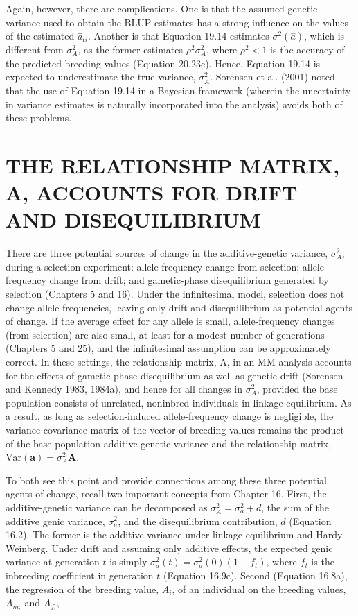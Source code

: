 \documentclass{article}
\begin{document}
Again, however, there are complications. One is that the assumed genetic variance used to obtain the BLUP estimates has a strong influence on the values of the estimated  $ \widehat{a}_{ti} $. Another is that Equation 19.14 estimates  $ \sigma^2(\widehat{a}) $, which is different from  $ \sigma_A^2 $, as the former estimates  $ \rho^2\sigma_A^2 $, where  $ \rho^2 < 1 $ is the accuracy of the predicted breeding values (Equation 20.23c). Hence, Equation 19.14 is expected to underestimate the true variance,  $ \sigma_A^2 $. Sorensen et al. (2001) noted that the use of Equation 19.14 in a Bayesian framework (wherein the uncertainty in variance estimates is naturally incorporated into the analysis) avoids both of these problems.

\section{THE RELATIONSHIP MATRIX, A, ACCOUNTS FOR DRIFT AND DISEQUILIBRIUM}
There are three potential sources of change in the additive-genetic variance,  $ \sigma_A^2 $, during a selection experiment: allele-frequency change from selection; allele-frequency change from drift; and gametic-phase disequilibrium generated by selection (Chapters 5 and 16). Under the infinitesimal model, selection does not change allele frequencies, leaving only drift and disequilibrium as potential agents of change. If the average effect for any allele is small, allele-frequency changes (from selection) are also small, at least for a modest number of generations (Chapters 5 and 25), and the infinitesimal assumption can be approximately correct. In these settings, the relationship matrix, A, in an MM analysis accounts for the effects of gametic-phase disequilibrium as well as genetic drift (Sorensen and Kennedy 1983, 1984a), and hence for all changes in  $ \sigma_A^2 $, provided the base population consists of unrelated, noninbred individuals in linkage equilibrium. As a result, as long as selection-induced allele-frequency change is negligible, the variance-covariance matrix of the vector of breeding values remains the product of the base population additive-genetic variance and the relationship matrix,  $ \mathrm{Var}(\mathbf{a}) = \sigma_A^2 \mathbf{A} $.

To both see this point and provide connections among these three potential agents of change, recall two important concepts from Chapter 16. First, the additive-genetic variance can be decomposed as  $ \sigma_A^2 = \sigma_a^2 + d $, the sum of the additive genic variance,  $ \sigma_a^2 $, and the disequilibrium contribution,  $ d $ (Equation 16.2). The former is the additive variance under linkage equilibrium and Hardy-Weinberg. Under drift and assuming only additive effects, the expected genic variance at generation  $ t $ is simply  $ \sigma_a^2(t) = \sigma_a^2(0)(1 - f_t) $, where  $ f_t $ is the inbreeding coefficient in generation  $ t $ (Equation 16.9c). Second (Equation 16.8a), the regression of the breeding value,  $ A_i $, of an individual on the breeding values,  $ A_{m_i} $ and  $ A_{f_i} $,
\end{document}
